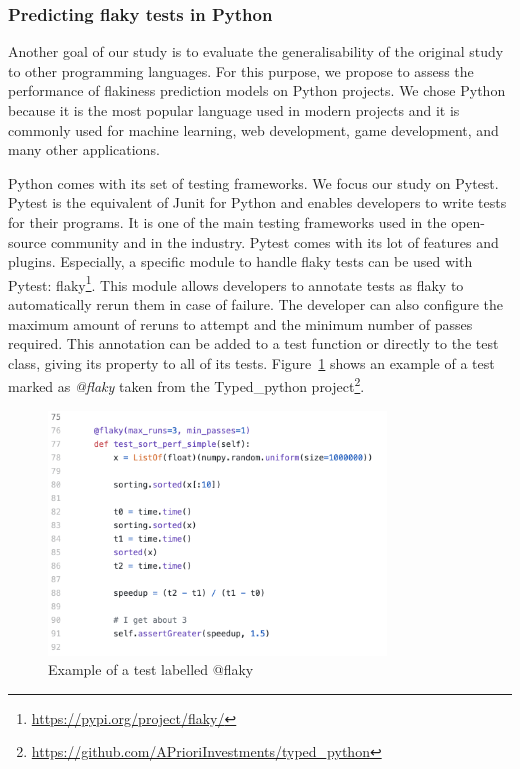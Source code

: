 \subsubsection{Predicting flaky tests in Python}
Another goal of our study is to evaluate the generalisability of the original study to other programming languages.
For this purpose, we propose to assess the performance of flakiness prediction models on Python projects. 
We chose Python because it is the most popular language used in modern projects and it is commonly used for machine learning, web development, game development, and many other applications.

Python comes with its set of testing frameworks. 
We focus our study on Pytest\cite{pytestdocumentation}. Pytest is the equivalent of Junit for Python and enables developers to write tests for their programs. It is one of the main testing frameworks used in the open-source community and in the industry.
Pytest comes with its lot of features and plugins. Especially, a specific module to handle flaky tests can be used with Pytest: flaky\footnote{\url{https://pypi.org/project/flaky/}}.  
This module allows developers to annotate tests as flaky to automatically rerun them in case of failure. 
The developer can also configure the maximum amount of reruns to attempt and the minimum number of passes required. 
This annotation can be added to a test function or directly to the test class, giving its property to all of its tests. 
Figure~\ref{flaky-example} shows an example of a test marked as \emph{@flaky} taken from the Typed\_python project\footnote{\url{https://github.com/APrioriInvestments/typed\_python}}.

\begin{figure}[ht]
\centering
\includegraphics[width=0.8\textwidth]{figures/replication/flakyExample.png}
\caption{Example of a test labelled @flaky}
\label{flaky-example}
\end{figure}

